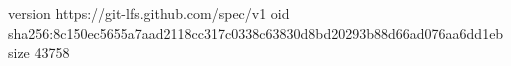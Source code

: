 version https://git-lfs.github.com/spec/v1
oid sha256:8c150ec5655a7aad2118cc317c0338c63830d8bd20293b88d66ad076aa6dd1eb
size 43758
